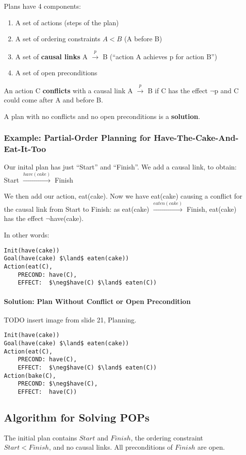 Plans have 4 components:
\begin{enumerate}
    \item A set of actions (steps of the plan)
    \item A set of ordering constraints $A < B$ (A before B)
    \item A set of \textbf{causal links} A $\xrightarrow{p}$ B (``action A
        achieves p for action B'')
    \item A set of open preconditions
\end{enumerate}

An action C \textbf{conflicts} with a causal link A $\xrightarrow{p}$ B if C
has the effect $\neg$p and C could come after A and before B.

A plan with no conflicts and no open preconditions is a \textbf{solution}.

\subsubsection{Example: Partial-Order Planning for Have-The-Cake-And-Eat-It-Too}
Our inital plan has just ``Start'' and ``Finish''. We add a causal link, to
obtain:
Start $\xrightarrow{have(cake)}$ Finish

We then add our action, eat(cake).
Now we have eat(cake) causing a conflict for the causal link from Start to
Finish: as eat(cake) $\xrightarrow{eaten(cake)}$ Finish, eat(cake) has the
effect $\neg$have(cake).

In other words:
\begin{lstlisting}[morekeywords={Init,Goal,Action}]
Init(have(cake))
Goal(have(cake) $\land$ eaten(cake))
Action(eat(C),
    PRECOND: have(C),
    EFFECT:  $\neg$have(C) $\land$ eaten(C))
\end{lstlisting}

\paragraph{Solution: Plan Without Conflict or Open Precondition}
TODO insert image from slide 21, Planning.

\begin{lstlisting}[morekeywords={Init,Goal,Action}]
Init(have(cake))
Goal(have(cake) $\land$ eaten(cake))
Action(eat(C),
    PRECOND: have(C),
    EFFECT:  $\neg$have(C) $\land$ eaten(C))
Action(bake(C),
    PRECOND: $\neg$have(C),
    EFFECT:  have(C))
\end{lstlisting}

\subsection{Algorithm for Solving POPs}
The initial plan contains $Start$ and $Finish$, the ordering constraint $Start
< Finish$, and no causal links. All preconditions of $Finish$ are open.

